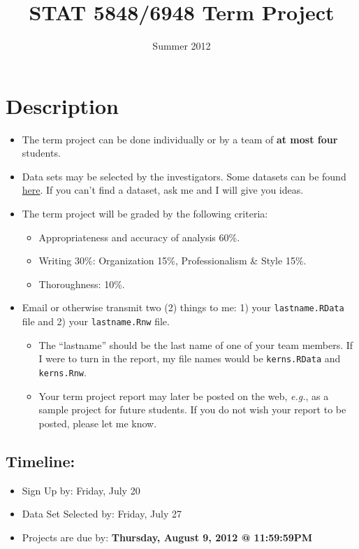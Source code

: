 \documentclass[10pt]{article}
\title{STAT 5848/6948 Term Project}
\date{\vspace{-0.5in} Summer 2012}
\begin{document}
\maketitle

\thispagestyle{empty}

\section*{Description}
\label{sec-1}


\begin{itemize}
\item The term project can be done individually or by a team of \textbf{at most four} students.
\item Data sets may be selected by the investigators.  Some datasets can be found \href{http://www-personal.buseco.monash.edu.au/~hyndman/TSDL/}{here}. If you can’t find a dataset, ask me and I will give you ideas.
\item The term project will be graded by the following criteria:
\begin{itemize}
\item Appropriateness and accuracy of analysis 60\%.
\item Writing 30\%: Organization 15\%, Professionalism \& Style 15\%.
\item Thoroughness: 10\%.
\end{itemize}
\item Email or otherwise transmit two (2) things to me: 1) your \texttt{lastname.RData} file and 2) your \texttt{lastname.Rnw} file.
\begin{itemize}
\item The ``lastname'' should be the last name of one of your team members. If I were to turn in the report, my file names would be \texttt{kerns.RData} and \texttt{kerns.Rnw}.
\item Your term project report may later be posted on the web, \emph{e.g.}, as a sample project for future students. If you do not wish your report to be posted, please let me know.
\end{itemize}
\end{itemize}
\subsection*{Timeline:}
\label{sec-1-1}

\begin{itemize}
\item Sign Up by: Friday, July 20
\item Data Set Selected by: Friday, July 27
\item Projects are due by: \textbf{Thursday, August 9, 2012 @ 11:59:59PM}
\end{itemize}
\end{document}
